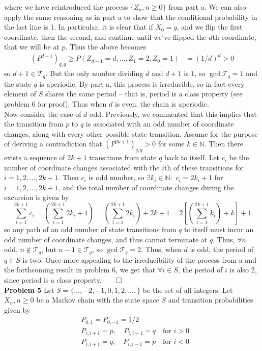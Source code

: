 \documentclass[11pt, letterpaper]{article}
\newcommand{\mbb}[1]{\mathbb{#1}}
\newcommand{\mc}[1]{\mathcal{#1}}
\begin{document}
    where we have reintroduced the process $\{Z_n,n\geq0\}$ from part a. We can also apply the same reasoning as in part a to show that the conditional probability in the last line is 1. In particular, it is clear that if $X_0=q$, and
    we flip the first coordinate, then the second, and continue until we've flipped the $d$th coordinate, that we will be at $p$. Thus the above becomes
    \begin{align*}
        (P^{d+1})_{q,q}\geq P(Z_{d-1}=d,\dots,Z_1=2,Z_0=1)&=(1/d)^d>0
    \end{align*}
    so $d+1\in\mc{T}_q$. But the only number dividing $d$ and $d+1$ is $1$, so $\gcd\mc{T}_q=1$ and the state $q$ is aperiodic. By part a, this process is irreducible, so in fact every
    element of $S$ shares the same period -- that is, period is a class property (see problem 6 for proof). Thus when $d$ is even, the chain is aperiodic.\\[10pt]
    Now consider the case of $d$ odd. Previously, we commented that this implies that the transition from $p$ to $q$ is associated with an odd number of coordinate changes, along with every other
    possible state transition.
    Assume for the purpose of deriving a contradiction that $(P^{2k+1})_{q,q}>0$ for some $k\in\mbb{N}$. Then there exists a sequence of $2k+1$ transitions from state $q$ back to itself. Let $c_i$ be the number of coordinate changes associated with the
    $i$th of these transitions for $i=1,2,\dots,2k+1$. Then $c_i$ is odd number, so $\exists k_i\in\mbb{N}:$ $c_i=2k_i+1$ for $i=1,2,\dots,2k+1$, and the total number of coordinate changes during the excursion is given by
    \[\sum_{i=1}^{2k+1}c_i=\left(\sum_{i=1}^{2k+1}2k_i+1\right)=\left(\sum_{i=1}^{2k+1}2k_i\right)+2k+1=2\left[\left(\sum_{i=1}^{2k+1}k_i\right)+k \right]+1\]
    so any path of an odd number of state transitions from $q$ to itself must incur an odd number of coordinate changes, and thus cannot terminate at $q$. Thus, $\forall n$ odd, $n\notin\mc{T}_q$, but $n-1\in\mc{T}_q$, so $\gcd\mc{T}_q=2$. Thus, when $d$ is odd, the period of $q\in S$ is two.
    Once more appealing to the irreducibility of the process from a and the forthcoming result in problem 6, we get that $\forall i\in S$, the period of $i$ is also 2, since period is a class property.\hfill{$\qed$}\\[10pt]
    {\bf Problem 5} Let $S=\{\dots,-2,-1,0,1,2,\dots,\}$ be the set of all integers. Let $X_n,n\geq 0$ be a Markov chain with the state space $S$ and transition probabilities given by
    \begin{align*}
        &P_{0,1}=P_{0,-1}=1/2\\
        &P_{i,i+1}=p,\quad P_{i,i-1}=q\quad\text{for $i>0$}\\
        &P_{i,i+1}=q,\quad P_{i,i-1}=p\quad\text{for $i<0$}
    \end{align*}
\end{document}

